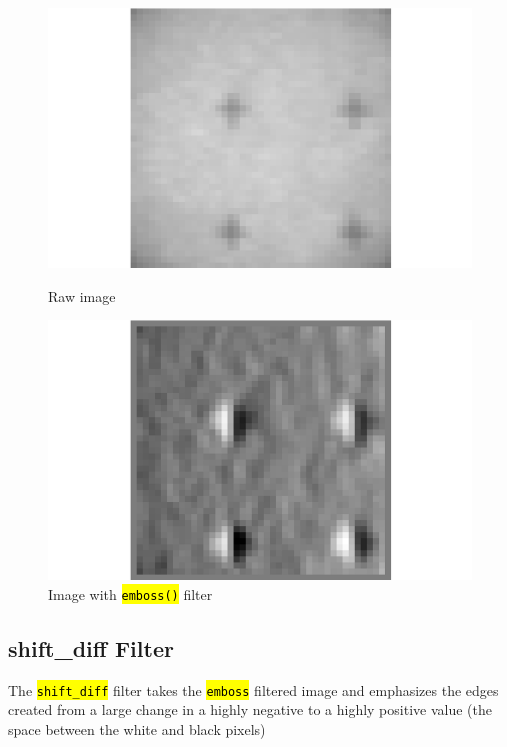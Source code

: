 \documentclass[10pt]{article}
\begin{document}
    \begin{figure}[h]
        \begin{minipage}{0.4\textwidth}
            \begin{center}
            \includegraphics[width=.75\linewidth]{../plots_tables_images/untouched.png}
            \caption{Raw image}
            \end{center}
        \end{minipage}
        \begin{minipage}{0.4\textwidth}
            \begin{center}
            \includegraphics[width=.75\linewidth]{../plots_tables_images/emboss.png}
            \caption{Image with \hl{\texttt{emboss()}} filter}
            \end{center}
        \end{minipage}
    \end{figure}

    \subsection{shift\_diff Filter}
    \label{sub:shift_diff_filter}
    The \hl{\texttt{shift\_diff}} filter takes the \hl{\texttt{emboss}} filtered image and emphasizes the edges created from a large change in a highly negative to a highly positive value (the space between the white and black pixels)
\end{document}

